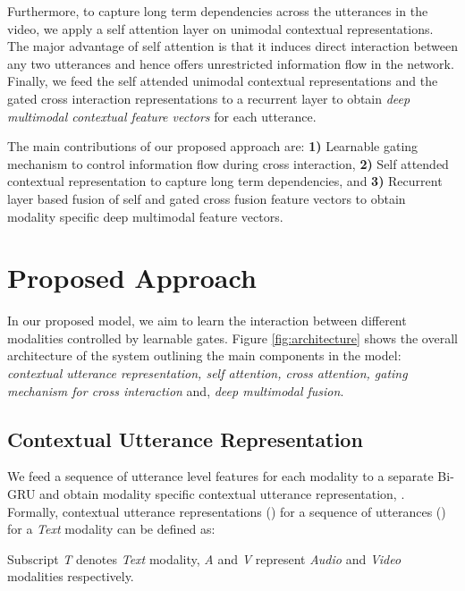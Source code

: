 \documentclass{article}
\begin{document}
Furthermore, to capture long term dependencies across the utterances in the video, we apply a self attention layer on unimodal contextual representations. The major advantage of self attention is that it induces direct interaction between any two utterances and hence offers unrestricted information flow in the network. Finally, we feed the self attended unimodal contextual representations and the gated cross interaction representations to a recurrent layer to obtain \textit{deep multimodal contextual feature vectors} for each utterance.

The main contributions of our proposed approach are: \textbf{1)} Learnable gating mechanism to control information flow during cross interaction, \textbf{2)} Self attended contextual representation to capture long term dependencies, and \textbf{3)} Recurrent layer based fusion of self and gated cross fusion feature vectors to obtain modality specific deep multimodal feature vectors.

\section{Proposed Approach}
\label{sec:approach}
In our proposed model, we aim to learn the interaction between different modalities controlled by learnable gates. Figure \ref{fig:architecture} shows the overall architecture of the system outlining the main components in the model: \textit{contextual utterance representation, self attention, cross attention, gating mechanism for cross interaction} and, \textit{deep multimodal fusion}.

\subsection{Contextual Utterance Representation}
We feed a sequence of utterance level features for each modality to a separate Bi-GRU \cite{DBLP:conf/emnlp/ChoMGBBSB14} and obtain modality specific contextual utterance representation, . Formally, contextual utterance representations () for a sequence of utterances () for a \textit{Text} modality can be defined as: 

Subscript \textit{T} denotes \textit{Text} modality, \textit{A} and \textit{V} represent \textit{Audio} and \textit{Video} modalities respectively.
\end{document}
